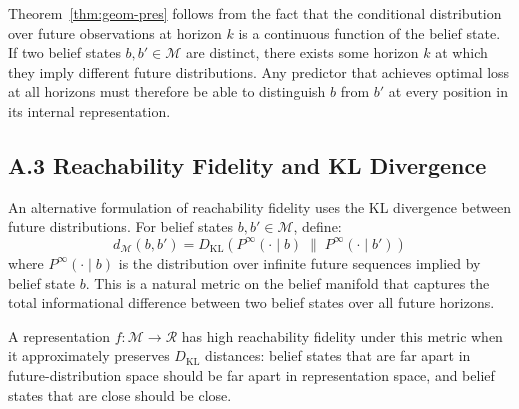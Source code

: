 \documentclass[12pt, a4paper]{article}
\theoremstyle{plain}
\theoremstyle{definition}
\theoremstyle{remark}
\begin{document}
Theorem~\ref{thm:geom-pres} follows from the fact that the conditional
distribution over future observations at horizon $k$ is a continuous
function of the belief state. If two belief states $b, b' \in \mathcal{M}$
are distinct, there exists some horizon $k$ at which they imply different
future distributions. Any predictor that achieves optimal loss at all
horizons must therefore be able to distinguish $b$ from $b'$ at every
position in its internal representation.

\subsection*{A.3 Reachability Fidelity and KL Divergence}

An alternative formulation of reachability fidelity uses the KL divergence
between future distributions. For belief states $b, b' \in \mathcal{M}$,
define:
$$d_{\mathcal{M}}(b, b') = D_{\mathrm{KL}}\left(P^\infty(\cdot \mid b) \;\|\; P^\infty(\cdot \mid b')\right)$$
where $P^\infty(\cdot \mid b)$ is the distribution over infinite future
sequences implied by belief state $b$. This is a natural metric on the
belief manifold that captures the total informational difference between
two belief states over all future horizons.

A representation $f: \mathcal{M} \to \mathcal{R}$ has high reachability
fidelity under this metric when it approximately preserves $D_{\mathrm{KL}}$
distances: belief states that are far apart in future-distribution space
should be far apart in representation space, and belief states that are
close should be close.
\end{document}
